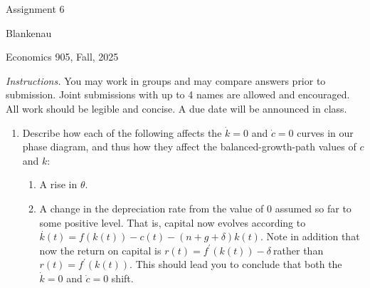\documentclass[12pt]{article}
\begin{document}
\begin{center}
{\LARGE Assignment 6}
\end{center}

\noindent Blankenau

\noindent Economics 905, Fall, 2025

\medskip
\noindent \noindent \textit{Instructions.} You may work in groups and may
compare answers prior to submission. Joint submissions with up to 4 names
are allowed and encouraged. All work should be legible and concise. A due
date will be announced in class.

\begin{enumerate}
\item Describe how each of the following affects the $\dot{k}=0$ and $\dot{c}%
=0$ curves in our phase diagram, and thus how they affect the
balanced-growth-path values of $c$ and $k$:

\begin{enumerate}
\item A rise in $\theta .$

\item A change in the depreciation rate from the value of 0 assumed so far
to some positive level. That is, capital now evolves according to $\overset{.%
}{k}\left( t\right) =f\left( k\left( t\right) \right) -c\left( t\right)
-\left( n+g+\delta \right) k\left( t\right) .$ Note in addition that now the
return on capital is $r\left( t\right) =f^{\prime }\left( k\left( t\right)
\right) -\delta \ $rather than $r\left( t\right) =f^{\prime }\left( k\left(
t\right) \right) .$ This should lead you to conclude that both the $\dot{k}%
=0 $ and $\dot{c}=0$ shift.
\end{enumerate}


\end{enumerate}
\end{document}
